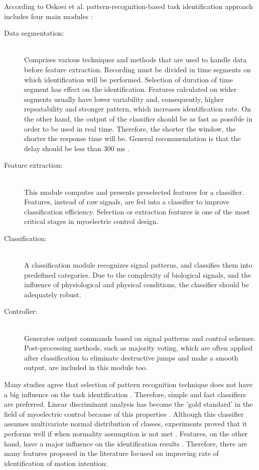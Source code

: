 According to Oskoei et al. pattern-recognition-based task identification approach includes four main modules \citep{Oskoei2007}:
\begin{description}
\item[Data segmentation:] \hfill \\
Comprises various techniques and methods that are used to handle data before feature extraction. Recording must be divided in time segments on which identification will be performed. Selection of duration of time segment has effect on the identification. Features calculated on wider segments usually have lower variability and, consequently, higher repeatability and stronger pattern, which increases identification rate. On the other hand, the output of the classifier should be as fast as possible in order to be used in real time.  Therefore, the shorter the window, the shorter the response time will be. General recommendation is that the delay should be less than 300 ms \citep{Oskoei2007, Englehart2003}. 
\item[Feature extraction:] \hfill \\
This module computes and presents preselected features for a classifier. Features, instead of raw signals, are fed into a classifier to improve classification efficiency. Selection or extraction features is one of the most critical stages in myoelectric control design.
\item[Classification:] \hfill \\
A classification module recognizes signal patterns, and classifies them into predefined categories. Due to the complexity of biological signals, and the influence of physiological and physical conditions, the classifier should be adequately robust.
\item[Controller:] \hfill \\Generates output commands based on signal patterns and control schemes. Post-processing methods, such as majority voting, which are often applied after classification to eliminate destructive jumps and make a smooth output, are included in this module too.
\end{description}

Many studies agree that selection of pattern recognition technique does not have a big influence on the task identification \citep{Hakonen2015}. Therefore, simple and fast classifiers are preferred. Linear discriminant analysis has become the 'gold standard' in the field of myoelectric control because of this properties \citep{Tkach2010, Li2014, Hakonen2015}. Although this classifier assumes multivariate normal distribution of classes, experiments proved that it performs well if when normality assumption is not met \citep{Grouven1996}. Features, on the other hand, have a major influence on the identification results \citep{Englehart1999, Tkach2010}. Therefore, there are many features proposed in the literature focused on improving rate of identification of motion intention:

